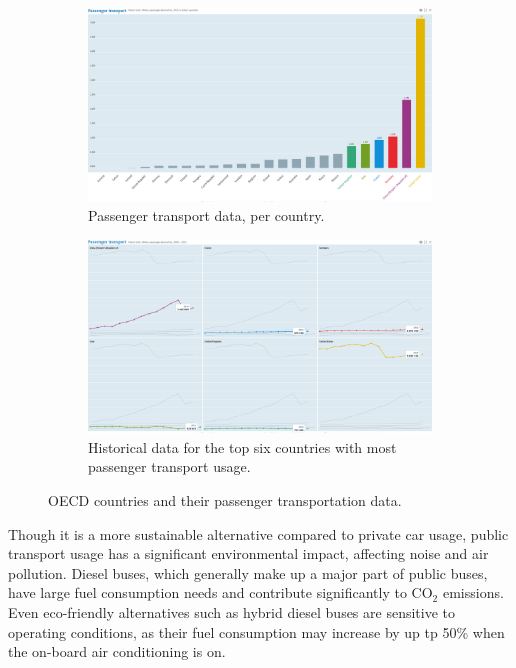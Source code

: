 \documentclass{article}
\begin{document}
\begin{figure}[H]
  \centering
  \begin{subfigure}[b]{.85\textwidth}
  	\centering
  	\includegraphics[width=\linewidth]{./images/OECD_passengers_absolute.png}
  	\caption{Passenger transport data, per country.}
  \end{subfigure}
  \begin{subfigure}[b]{.85\textwidth}
  	\centering
  	\includegraphics[width=\linewidth]{./images/OECD_passengers_increase.png}
  	\caption{Historical data for the top six countries with most passenger transport usage.}
  \end{subfigure}
  \caption{OECD countries and their passenger transportation data.}
  	\label{fig:transportation/passenger}
\end{figure}

Though it is a more sustainable alternative compared to private car usage, public transport usage has a significant environmental impact, affecting noise and air pollution. Diesel buses, which generally make up a major part of public buses, have large fuel consumption needs and contribute significantly to CO$_{2}$ emissions. Even eco-friendly alternatives such as hybrid diesel buses are sensitive to operating conditions, as their fuel consumption may increase by up tp 50\% when the on-board air conditioning is on.\cite{zhang2014real}
\end{document}
